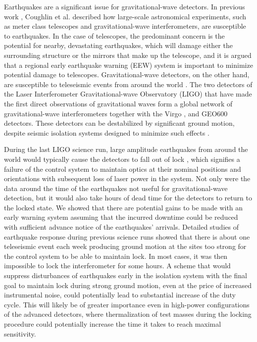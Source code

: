 \documentclass[twocolumn, aps, superscriptaddress]{revtex4}
\begin{document}
Earthquakes are a significant issue for gravitational-wave detectors. In previous work \cite{CoSt2015}, Coughlin et al. described how large-scale astronomical experiments, such as meter class telescopes and gravitational-wave interferometers, are susceptible to earthquakes. In the case of telescopes, the predominant concern is the potential for nearby, devastating earthquakes, which will damage either the surrounding structure or the mirrors that make up the telescope, and it is argued that a regional early earthquake warning (EEW) \cite{Al2012,KuAl2013a,KuAl2013b,KuHe2014,CoLa2009a,CoLa2009b,BoAl2014,HoKa2008,HoEA2011c,StAl2016} system is important to minimize potential damage to telescopes. 
Gravitational-wave detectors, on the other hand, are susceptible to teleseismic events from around the world \cite{MaFa2012}. 
The two detectors of the Laser Interferometer Gravitational-wave Observatory (LIGO) \cite{aligo} that have made the first direct observations of gravitational waves \cite{AbEA2016a,AbEA2016e} form a global network of gravitational-wave interferometers together with the Virgo \cite{avirgo}, and GEO600 \cite{Gr2010} detectors. These detectors can be destabilized by significant ground motion, despite seismic isolation systems designed to minimize such effects \cite{AbAd2002,StAb2009,MaLa2015}.

During the last LIGO science run, large amplitude earthquakes from around the world would typically cause the detectors to fall out of lock \cite{CoSt2015}, which signifies a failure of the control system to maintain optics at their nominal positions and orientations with subsequent loss of laser power in the system. Not only were the data around the time of the earthquakes not useful for gravitational-wave detection, but it would also take hours of dead time for the detectors to return to the locked state. 
We showed that there are potential gains to be made with an early warning system assuming that the incurred downtime could be reduced with sufficient advance notice of the earthquakes' arrivals.
Detailed studies of earthquake response during previous science runs showed that there is about one teleseismic event each week producing ground motion at the sites too strong for the control system to be able to maintain lock. In most cases, it was then impossible to lock the interferometer for some hours. A scheme that would suppress disturbances of earthquakes early in the isolation system with the final goal to maintain lock during strong ground motion, even at the price of increased instrumental noise, could potentially lead to substantial increase of the duty cycle. This will likely be of greater importance even in high-power configurations of the advanced detectors, where thermalization of test masses during the locking procedure could potentially increase the time it takes to reach maximal sensitivity.
\end{document}
